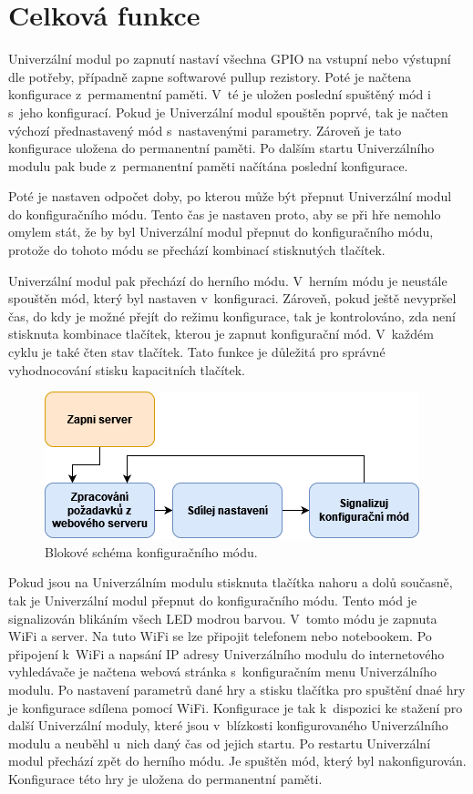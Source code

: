 \section{Celková funkce}
Univerzální modul po zapnutí nastaví všechna GPIO na vstupní nebo výstupní dle potřeby, případně zapne softwarové pullup rezistory. Poté je načtena konfigurace z~permamentní paměti. V~té je uložen poslední spuštěný 
mód  
i s~jeho konfigurací. Pokud je Univerzální modul spouštěn poprvé, tak je načten výchozí přednastavený mód s~nastavenými parametry. Zároveň je tato konfigurace uložena do permanentní paměti. Po dalším startu 
Univerzálního modulu pak bude z~permanentní paměti načítána poslední konfigurace. 

Poté je nastaven odpočet doby, po kterou může být přepnut Univerzální modul do konfiguračního módu. Tento čas je nastaven proto, aby se při hře nemohlo omylem stát, že by byl Univerzální modul přepnut do 
konfiguračního módu, protože do tohoto módu se přechází kombinací stisknutých tlačítek. 

Univerzální modul pak přechází do herního módu. V~herním módu je neustále spouštěn mód, který byl nastaven v~konfiguraci. Zároveň, pokud ještě nevypršel čas, do kdy je možné přejít do režimu konfigurace, tak 
je kontrolováno, zda není stisknuta kombinace tlačítek, kterou je zapnut konfigurační mód. V~každém cyklu je také čten stav tlačítek. Tato funkce je důležitá pro správné vyhodnocování stisku kapacitních tlačítek. 

\begin{figure}[!h]
  \begin{center}
    \includegraphics[scale=0.8]{obrazky/blokove_schema_modu_CONFIGURATION.png}
  \end{center}
  \caption[Blokové schéma konfiguračního módu]{Blokové schéma konfiguračního módu.}
\end{figure}

Pokud jsou na Univerzálním modulu stisknuta tlačítka nahoru a dolů současně, tak je Univerzální modul přepnut do konfiguračního módu. Tento mód je signalizován blikáním všech LED modrou barvou. V~tomto módu je zapnuta WiFi a server. Na 
tuto WiFi se lze připojit telefonem nebo notebookem. Po připojení k~WiFi a napsání IP adresy Univerzálního modulu do internetového vyhledávače je načtena webová stránka s~konfiguračním menu Univerzálního modulu. Po nastavení parametrů 
dané hry a stisku 
tlačítka pro spuštění dnaé hry je konfigurace sdílena pomocí WiFi. Konfigurace je tak k~dispozici ke stažení pro další Univerzální moduly, které jsou v~blízkosti konfigurovaného Univerzálního modulu a neuběhl u~nich daný čas od jejich 
startu. Po restartu Univerzální modul přechází zpět do herního módu. Je spuštěn mód, který byl nakonfigurován. Konfigurace této hry je uložena do permanentní paměti.


